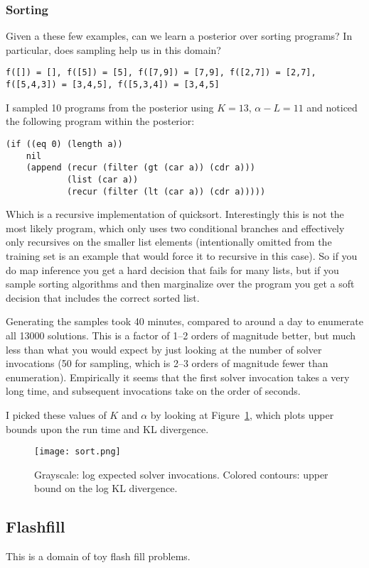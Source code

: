 \documentclass{article}
\begin{document}
\subsubsection{Sorting}
Given a these few examples, can we learn a posterior over sorting programs? In particular, does sampling help us in this domain?
\begin{verbatim}
f([]) = [], f([5]) = [5], f([7,9]) = [7,9], f([2,7]) = [2,7], 
f([5,4,3]) = [3,4,5], f([5,3,4]) = [3,4,5]
\end{verbatim}

I sampled 10 programs from the posterior using $K = 13$, $\alpha -L = 11$ and noticed the following program within the posterior:
\begin{verbatim}
(if ((eq 0) (length a))
    nil
    (append (recur (filter (gt (car a)) (cdr a)))
            (list (car a))
            (recur (filter (lt (car a)) (cdr a)))))
\end{verbatim}
Which is a recursive implementation of quicksort. Interestingly this is not the most likely program, which only uses two conditional branches and effectively only recursives on the smaller list elements (intentionally omitted from the training set is an example that would force it to recursive in this case).
So if you do map inference you get a hard decision that fails for many lists,
but if you sample sorting algorithms and then marginalize over the program you get a soft decision that includes the correct sorted list.

Generating the samples took 40 minutes, compared to around a day to enumerate all 13000 solutions.
This is a factor of 1--2 orders of magnitude better, but much less than what you would expect by just looking at the number of solver invocations (50 for sampling, which is 2--3 orders of magnitude fewer than enumeration).
Empirically it seems that the first solver invocation takes a very long time,
and subsequent invocations take on the order of seconds.

I picked these values of $K$ and $\alpha$ by looking at Figure~\ref{sorting}, which plots upper bounds upon the run time and KL divergence.
\begin{figure}\label{sorting}
  \texttt{[image: sort.png]}
  \caption{Grayscale: log expected solver invocations. Colored contours: upper bound on the log KL divergence. }
\end{figure}

\subsection{Flashfill}
This is a domain of toy flash fill problems.
\end{document}
